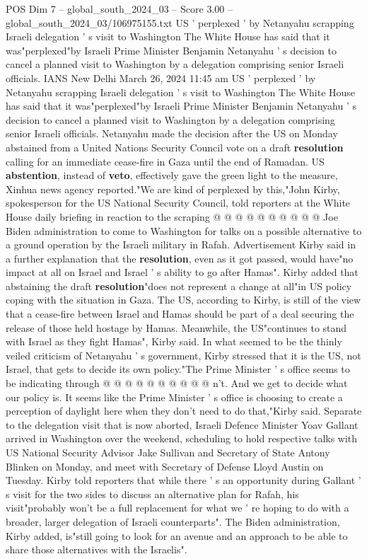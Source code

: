 \begin{textsample}{POS Dim 7 – global\_south\_2024\_03 – Score 3.00 – global\_south\_2024\_03/106975155.txt}  \label{ex:f7_pos_026}
US ' perplexed ' by Netanyahu scrapping Israeli delegation ' s visit to Washington The White House has said that it was"perplexed"by Israeli Prime Minister Benjamin Netanyahu ' s decision to cancel a planned visit to Washington by a delegation comprising senior Israeli officials.
IANS New Delhi March 26, 2024 11:45 am US ' perplexed ' by Netanyahu scrapping Israeli delegation ' s visit to Washington The White House has said that it was"perplexed"by Israeli Prime Minister Benjamin Netanyahu ' s decision to cancel a planned visit to Washington by a delegation comprising senior Israeli officials.
Netanyahu made the decision after the US on Monday abstained from a United Nations Security Council vote on a draft \textbf{resolution} calling for an immediate cease-fire in Gaza until the end of Ramadan.
US \textbf{abstention}, instead of \textbf{veto}, effectively gave the green light to the measure, Xinhua news agency reported."We are kind of perplexed by this,"John Kirby, spokesperson for the US National Security Council, told reporters at the White House daily briefing in reaction to the scraping @ @ @ @ @ @ @ @ @ @ Joe Biden administration to come to Washington for talks on a possible alternative to a ground operation by the Israeli military in Rafah.
Advertisement Kirby said in a further explanation that the \textbf{resolution}, even as it got passed, would have"no impact at all on Israel and Israel ' s ability to go after Hamas".
Kirby added that abstaining the draft \textbf{resolution}"does not represent a change at all"in US policy coping with the situation in Gaza.
The US, according to Kirby, is still of the view that a cease-fire between Israel and Hamas should be part of a deal securing the release of those held hostage by Hamas.
Meanwhile, the US"continues to stand with Israel as they fight Hamas", Kirby said.
In what seemed to be the thinly veiled criticism of Netanyahu ' s government, Kirby stressed that it is the US, not Israel, that gets to decide its own policy."The Prime Minister ' s office seems to be indicating through @ @ @ @ @ @ @ @ @ @ n't.
And we get to decide what our policy is.
It seems like the Prime Minister ' s office is choosing to create a perception of daylight here when they don't need to do that,"Kirby said.
Separate to the delegation visit that is now aborted, Israeli Defence Minister Yoav Gallant arrived in Washington over the weekend, scheduling to hold respective talks with US National Security Advisor Jake Sullivan and Secretary of State Antony Blinken on Monday, and meet with Secretary of Defense Lloyd Austin on Tuesday.
Kirby told reporters that while there ' s an opportunity during Gallant ' s visit for the two sides to discuss an alternative plan for Rafah, his visit"probably won't be a full replacement for what we ' re hoping to do with a broader, larger delegation of Israeli counterparts".
The Biden administration, Kirby added, is"still going to look for an avenue and an approach to be able to share those alternatives with the Israelis".

\end{textsample}
